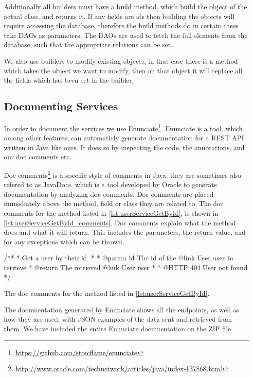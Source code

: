 Additionally all builders must have a build method, which build the object of the actual class, and returns it.
If any fields are ids then building the objects will require accessing the database,
therefore the build methods do in certain cases take \acp{DAO} as parameters.
The \acp{DAO} are used to fetch the full elements from the database,
such that the appropriate relations can be set.

We also use builders to modify existing objects,
in that case there is a method which takes the object we want to modify,
then on that object it will replace all the fields which has been set in the builder.

\subsection{Documenting Services}\label{documenting_services}
In order to document the services we use Enunciate\footnote{\url{https://github.com/stoicflame/enunciate}}.
Enunciate is a tool, which among other features, can automaticly generate documentation for a REST API written in Java like ours.
It does so by inspecting the code, the annotations, and our doc comments etc.

Doc comments\footnote{\url{http://www.oracle.com/technetwork/articles/java/index-137868.html}} is a specific style of comments in Java, they are sometimes also refered to as JavaDocs, which is a tool developed by Oracle to generate documentation by analyzing doc comments.
Doc comments are placed immediately above the method, field or class they are related to.
The doc comments for the method listed in \cref{lst:userServiceGetById}, is shown in \cref{lst:userServiceGetById_comments}.
Doc comments explain what the method does and what it will return.
This includes the parameters, the return value, and for any exceptions which can be thrown.

\begin{listing}
    \begin{java2}
/**
 * Get a user by their id.
 *
 * @param id The id of the {@link User user} to retrieve
 * @return The retrieved {@link User user}
 *
 * @HTTP 404 User not found
 */
    \end{java2}
    \caption{The doc comments for the method listed in \cref{lst:userServiceGetById}.}\label{lst:userServiceGetById_comments}
\end{listing}

The documentation generated by Enunciate shows all the endpoints, as well as how they are used,
with JSON examples of the data sent and retrieved from them.
We have included the entire Enunciate documentation on the ZIP file.

